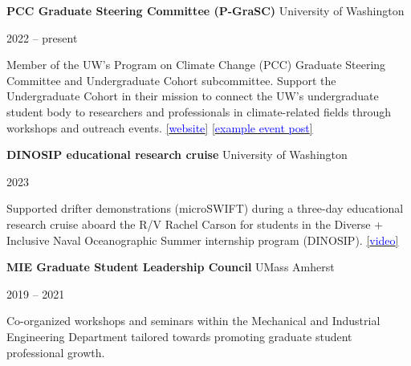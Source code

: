\documentclass[letterpaper,11pt]{article}
\newenvironment{indentPar}[1]{
  \justifying
  \begin{list}{}{\setlength{\leftmargin}{#1}}%
  \item[]
}
{\end{list}}
\newcommand{\mentorshipExpEntry}[4]{
  \begin{minipage}[t]{.75\textwidth}
    \begin{flushleft}
      \textbf{#1}
      #2
    \end{flushleft}
  \end{minipage}
  \hfill
  \begin{minipage}[t]{.20\textwidth}
    \begin{flushright}
      #3%
    \end{flushright}
  \end{minipage}%
  \vspace{-7pt}
  \begin{indentPar}{0.5cm}
    #4%
  \end{indentPar}
}
\newcommand{\serviceExpEntry}[4]{
  \begin{minipage}[t]{.75\textwidth}
    \begin{flushleft}
      \textbf{#1}
      #2
    \end{flushleft}
  \end{minipage}
  \hfill
  \begin{minipage}[t]{.20\textwidth}
    \begin{flushright}
      #3%
    \end{flushright}
  \end{minipage}%
  \vspace{-7pt}
  \begin{indentPar}{0.5cm}
    #4%
  \end{indentPar}
}
\newcommand{\highp}{$^\vartriangle$}
\newcommand{\medp}{$^\circ$}
\newcommand{\lowp}{$^\triangledown$}
\begin{document}
\serviceExpEntry
  {PCC Graduate Steering Committee (P-GraSC)}{University of Washington}
  {2022 -- present}
  {Member of the UW's Program on Climate Change (PCC) Graduate Steering Committee and Undergraduate Cohort subcommittee. Support the Undergraduate Cohort in their mission to connect the UW's undergraduate student body to researchers and professionals in climate-related fields through workshops and outreach events.
  \href{https://uwpcc.ocean.washington.edu/person/Jacob_Davis}{[\textcolor{blue}{website}]}
  \href{ https://pcc.uw.edu/blog/2024/02/21/feb-career-panel/?mkt_tok=MTMxLUFRTy0yMjUAAAGSFVBPreufqKJd_IpUEwKLbDDPujcpwYDrEMayynErYf3nFL5ckUUbDNwQM8rrKrGGOD9CSHrZUUIAo56tMgym7_HCeSk5HNBvhnY3R1SmQQPCsxLz}{[\textcolor{blue}{example event post}]}}
%
\serviceExpEntry
  {DINOSIP educational research cruise}{University of Washington}
  {2023}
  {Supported drifter demonstrations (microSWIFT) during a three-day educational research cruise aboard the R/V Rachel Carson for students in the Diverse + Inclusive Naval Oceanographic Summer internship program (DINOSIP). \href{https://www.youtube.com/watch?v=clPGjtLVKqw}{[\textcolor{blue}{video}]}}
%
\serviceExpEntry
  {MIE Graduate Student Leadership Council}{UMass Amherst}
  {2019 -- 2021}
  {Co-organized workshops and seminars within the Mechanical and Industrial Engineering Department tailored towards
  promoting graduate student professional growth.}
%
\end{document}
